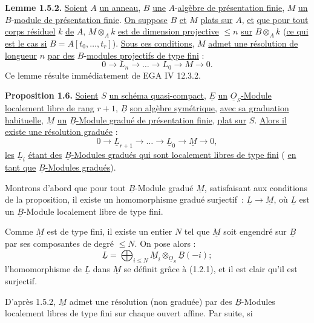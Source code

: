 
\textbf{Lemme 1.5.2.} \uline{Soient} \(A\) \uline{un anneau}, \(B\) \uline{une} \(A\)-\uline{algèbre de présentation finie}, \(M\) \uline{un} \(B\)-\uline{module de présentation finie}. \uline{On suppose} \(B\) \uline{et} \(M\) \uline{plats sur} \(A\), \uline{et} \uline{que pour tout corps résiduel} \(k\) \uline{de} \(A\), \(M\otimes_A k\) \uline{est de dimension projective} \(\leq n\) \uline{sur} \(B\otimes_A k\) (\uline{ce qui est le cas si} \(B=A[t_0,\ldots,t_r]\)). \uline{Sous ces conditions}, \(M\) \uline{admet une résolution de longueur} \(n\) \uline{par des} \(B\)-\uline{modules projectifs de type fini} :
\[
  0\longrightarrow L_n\longrightarrow\ldots\longrightarrow L_0\longrightarrow M\longrightarrow 0.
\]
Ce lemme résulte immédiatement de EGA IV 12.3.2.

\textbf{Proposition 1.6.} \uline{Soient} \(S\) \uline{un schéma quasi-compact}, \(\underline{E}\) \uline{un} \(\underline{O}_S\)\uline{-Module localement libre de rang} \(r+1\), \(\underline{B}\) \uline{son algèbre symétrique}, \uline{avec sa graduation habituelle}, \(\underline{M}\) \uline{un} \(\underline{B}\)\uline{-Module gradué de présentation finie}, \uline{plat sur} \(S\). \uline{Alors il existe une résolution graduée} :
\[
  0\longrightarrow \underline{L}_{r+1}\longrightarrow\ldots\longrightarrow \underline{L}_0\longrightarrow \underline{M}\longrightarrow 0,
\]
\uline{les} \(\underline{L}_i\) \uline{étant des} \(\underline{B}\)\uline{-Modules gradués qui sont localement libres de type fini} ( \uline{en tant que} \(\underline{B}\)\uline{-Modules gradués}).

Montrons d'abord que pour tout \(\underline{B}\)-Module gradué \(\underline{M}\), satisfaisant aux conditions de la proposition, il existe un homomorphisme gradué surjectif~: \(\underline{L}\to \underline{M}\), où \(\underline{L}\) est un \(\underline{B}\)-Module localement libre de type fini.

Comme \(\underline{M}\) est de type fini, il existe un entier \(N\) tel que \(\underline{M}\) soit engendré sur \(\underline{B}\) par ses composantes de degré \(\leq N\). On pose alors :
\[
  \underline{L}=\bigoplus_{i\leq N} \underline{M}_i\otimes_{\underline{O}_S}\underline{B}(-i);
\]
l'homomorphisme de \(\underline{L}\) dans \(\underline{M}\) se définit grâce à (1.2.1), et il est clair qu'il est surjectif.

D'après 1.5.2, \(\underline{M}\) admet une résolution (non graduée) par des \(\underline{B}\)-Modules localement libres de type fini sur chaque ouvert affine. Par suite, si 
